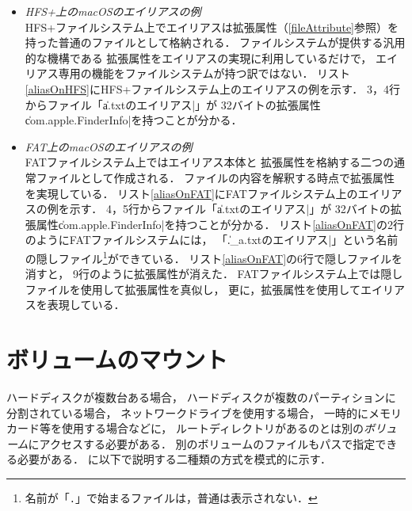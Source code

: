 \begin{itemize}
  \begin{itemize}
  \item \emph{HFS+上のmacOSのエイリアスの例} \\
    HFS+ファイルシステム上でエイリアスは拡張属性（\ref{fileAttribute}参照）を
    持った普通のファイルとして格納される．
    ファイルシステムが提供する汎用的な機構である
    拡張属性をエイリアスの実現に利用しているだけで，
    エイリアス専用の機能をファイルシステムが持つ訳ではない．
    リスト\ref{aliasOnHFS}にHFS+ファイルシステム上のエイリアスの例を示す．
    3，4行からファイル「\|a.txtのエイリアス|」が
    32バイトの拡張属性\|com.apple.FinderInfo|を持つことが分かる．

    

  \item \emph{FAT上のmacOSのエイリアスの例} \\
    FATファイルシステム上ではエイリアス本体と
    拡張属性を格納する二つの通常ファイルとして作成される．
    ファイルの内容を解釈する時点で拡張属性を実現している．
    リスト\ref{aliasOnFAT}にFATファイルシステム上のエイリアスの例を示す．
    4，5行からファイル「\|a.txtのエイリアス|」が
    32バイトの拡張属性\|com.apple.FinderInfo|を持つことが分かる．
    リスト\ref{aliasOnFAT}の2行のようにFATファイルシステムには，
    「\|._a.txtのエイリアス|」という名前の隠しファイル\footnote{
      名前が「\texttt{.}」で始まるファイルは，普通は表示されない．
    }ができている．
    リスト\ref{aliasOnFAT}の6行で隠しファイルを消すと，
    9行のように拡張属性が消えた．
    FATファイルシステム上では隠しファイルを使用して拡張属性を真似し，
    更に，拡張属性を使用してエイリアスを表現している．

    

  \end{itemize}
\end{itemize}

\section{ボリュームのマウント}
ハードディスクが複数台ある場合，
ハードディスクが複数のパーティションに分割されている場合，
ネットワークドライブを使用する場合，
一時的にメモリカード等を使用する場合などに，
ルートディレクトリがあるのとは別の\emph{ボリューム}にアクセスする必要がある．
別のボリュームのファイルもパスで指定できる必要がある．
に以下で説明する二種類の方式を模式的に示す．

